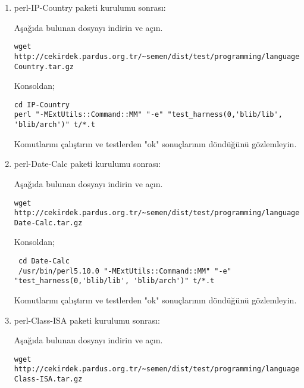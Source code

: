 \documentclass[a4paper,10pt]{article}
\begin{document}
\begin{enumerate}
\item perl-IP-Country paketi kurulumu sonrası:

Aşağıda bulunan dosyayı indirin ve açın.
\begin{verbatim}
wget http://cekirdek.pardus.org.tr/~semen/dist/test/programming/language/perl/IP-Country.tar.gz
\end{verbatim}

Konsoldan;
\begin{verbatim}
cd IP-Country
perl "-MExtUtils::Command::MM" "-e" "test_harness(0,'blib/lib', 'blib/arch')" t/*.t
\end{verbatim}

Komutlarını çalıştırın ve testlerden "ok" sonuçlarının döndüğünü gözlemleyin.

% 
% 
% 

\item perl-Date-Calc paketi kurulumu sonrası:

Aşağıda bulunan dosyayı indirin ve açın.
\begin{verbatim}
wget http://cekirdek.pardus.org.tr/~semen/dist/test/programming/language/perl/
Date-Calc.tar.gz
\end{verbatim}

Konsoldan;
\begin{verbatim}
 cd Date-Calc
 /usr/bin/perl5.10.0 "-MExtUtils::Command::MM" "-e" "test_harness(0,'blib/lib', 'blib/arch')" t/*.t
\end{verbatim}

Komutlarını çalıştırın ve testlerden "ok" sonuçlarının döndüğünü gözlemleyin.

\item perl-Class-ISA paketi kurulumu sonrası:

Aşağıda bulunan dosyayı indirin ve açın.
\begin{verbatim}
wget http://cekirdek.pardus.org.tr/~semen/dist/test/programming/language/perl/
Class-ISA.tar.gz
\end{verbatim}


\end{enumerate}
\end{document}
